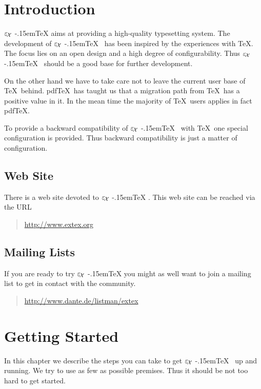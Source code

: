 \documentclass[12pt,div12,a4paper]{scrbook}
\providecommand*{\ExTeX}{\ifx\texorpdfstring\undefined
  \textrm{%
    \ensuremath{\textstyle\varepsilon_{\kern-0.15em\mathcal{X}}}%
    \kern-.15em\TeX}%
  \else\texorpdfstring{%
  \textrm{%
    \ensuremath{\textstyle\varepsilon_{\kern-0.15em\mathcal{X}}}%
    \kern-.15em\TeX
  }}{ExTeX}%
  \fi
}
\begin{document}
\newpage
\tableofcontents
\newpage

\chapter{Introduction}

\ExTeX{} aims at providing a high-quality typesetting system. The
development of \ExTeX\ has been inspired by the experiences with \TeX.
The focus lies on an open design and a high degree of configurability.
Thus \ExTeX\ should be a good base for further development.

On the other hand we have to take care not to leave the current user
base of \TeX\ behind. pdf\TeX\ has taught us that a migration path
from \TeX\ has a positive value in it. In the mean time the majority
of \TeX\ users applies in fact pdf\TeX.

To provide a backward compatibility of \ExTeX\ with \TeX\ one special
configuration is provided. Thus backward compatibility is just a
matter of configuration.


\section{Web Site}

There is a web site devoted to \ExTeX. This web site can be reached
via the URL

\begin{quotation}
  \url{http://www.extex.org}
\end{quotation}


\section{Mailing Lists}

If you are ready to try \ExTeX{} you might as well want to join a
mailing list to get in contact with the community.

\begin{quotation}
  \url{http://www.dante.de/listman/extex}
\end{quotation}


\chapter{Getting Started}

In this chapter we describe the steps you can take to get \ExTeX\ up
and running. We try to use as few as possible premises. Thus it should
be not too hard to get started.
\end{document}
